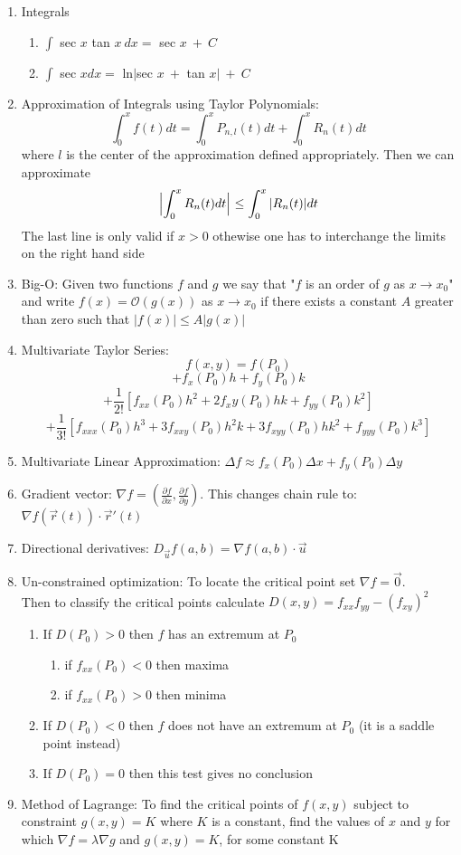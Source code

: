 \documentclass[12pt]{article}
\begin{document}
\begin{enumerate}
\item Integrals
    \begin{enumerate}
        \parskip=0in
        \parsep=0in
        \itemsep=0.15in
    \item $\int$ sec $x$ tan $x\ dx = $ sec $x \ + \ C  $
    \item $\int$ sec $x dx = $ ln$|$sec $x \ + $ tan $x| \ + \ C  $
    \end{enumerate}
\item Approximation of Integrals using Taylor Polynomials: $$\int_0^xf(t)dt = \int_0^xP_{n,l}(t)dt + \int_0^xR_n(t)dt$$ where $l$ is the center of the approximation defined appropriately. Then we can approximate $$\Bigl| \int_0^xR_n(t)dt\Bigl|\ \leq \int_0^x|R_n(t)|dt$$ The last line is only valid if $x > 0$ othewise one has to interchange the limits on the right hand side
\item Big-O: Given two functions $f$ and $g$ we say that "$f$ is an order of $g$ as $x\rightarrow x_0$" and write $f(x) =  \mathcal{O}(g(x))$ as $x\rightarrow x_0$ if there exists a constant $A$ greater than zero such that $|f(x)| \le A|g(x)|$
\item Multivariate Taylor Series: $$f(x,y) = f(P_0)$$ $$ + f_x(P_0)h + f_y(P_0)k $$ $$+ \frac{1}{2!}[f_{xx}(P_0)h^2 + 2f_xy(P_0)hk + f_{yy}(P_0)k^2]$$ $$ + \frac{1}{3!}[f_{xxx}(P_0)h^3 + 3f_{xxy}(P_0)h^2k + 3f_{xyy}(P_0)hk^2 + f_{yyy}(P_0)k^3]$$
\item Multivariate Linear Approximation: $\Delta f \approx f_x(P_0)\Delta x + f_y(P_0) \Delta y$
\item Gradient vector: $\nabla f = (\frac{\partial f}{\partial x}, \frac{\partial f}{\partial y})$. This changes chain rule to: $\nabla f(\vec r (t)) \cdot \vec r'(t)$ 
\item Directional derivatives: $D_{\vec u} f(a,b) = \nabla f(a,b) \cdot \vec u$
\item Un-constrained optimization: To locate the critical point set $\nabla f = \vec 0$. \\Then to classify the critical points calculate $D(x,y) = f_{xx}f_{yy} - (f_{xy})^2$
    \begin{enumerate}
        \item If $D(P_0) > 0$ then $f$ has an extremum at $P_0$
        \begin{enumerate}
            \item if $f_{xx}(P_0) < 0$ then maxima
            \item if $f_{xx}(P_0) > 0$ then minima
        \end{enumerate}
        \item If $D(P_0) < 0$ then $f$ does not have an extremum at $P_0$ (it is a saddle point instead)
        \item If $D(P_0) = 0$ then this test gives no conclusion
    \end{enumerate}
\item Method of Lagrange: To find the critical points of $f(x,y)$ subject to constraint $g(x,y) = K$ where $K$ is a constant, find the values of $x$ and $y$ for which $\nabla f = \lambda \nabla g$ and $g(x,y) = K$, for some constant K
\end{enumerate}



\pagebreak
\setlength{\voffset}{0.15in}
\end{document}
